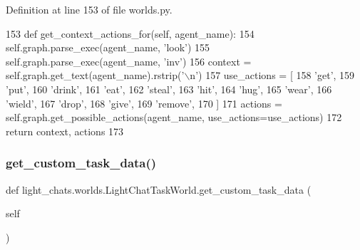 Definition at line 153 of file worlds.\+py.


\begin{DoxyCode}
153     \textcolor{keyword}{def }get\_context\_actions\_for(self, agent\_name):
154         self.graph.parse\_exec(agent\_name, \textcolor{stringliteral}{'look'})
155         self.graph.parse\_exec(agent\_name, \textcolor{stringliteral}{'inv'})
156         context = self.graph.get\_text(agent\_name).rstrip(\textcolor{stringliteral}{'\(\backslash\)n'})
157         use\_actions = [
158             \textcolor{stringliteral}{'get'},
159             \textcolor{stringliteral}{'put'},
160             \textcolor{stringliteral}{'drink'},
161             \textcolor{stringliteral}{'eat'},
162             \textcolor{stringliteral}{'steal'},
163             \textcolor{stringliteral}{'hit'},
164             \textcolor{stringliteral}{'hug'},
165             \textcolor{stringliteral}{'wear'},
166             \textcolor{stringliteral}{'wield'},
167             \textcolor{stringliteral}{'drop'},
168             \textcolor{stringliteral}{'give'},
169             \textcolor{stringliteral}{'remove'},
170         ]
171         actions = self.graph.get\_possible\_actions(agent\_name, use\_actions=use\_actions)
172         \textcolor{keywordflow}{return} context, actions
173 
\end{DoxyCode}
\mbox{\label{classlight__chats_1_1worlds_1_1LightChatTaskWorld_ae833f9c90611842891f1af2b9c67b22c}} 
\subsubsection{\texorpdfstring{get\+\_\+custom\+\_\+task\+\_\+data()}{get\_custom\_task\_data()}}
{\footnotesize\ttfamily def light\+\_\+chats.\+worlds.\+Light\+Chat\+Task\+World.\+get\+\_\+custom\+\_\+task\+\_\+data (\begin{DoxyParamCaption}\item[{}]{self }\end{DoxyParamCaption})}




